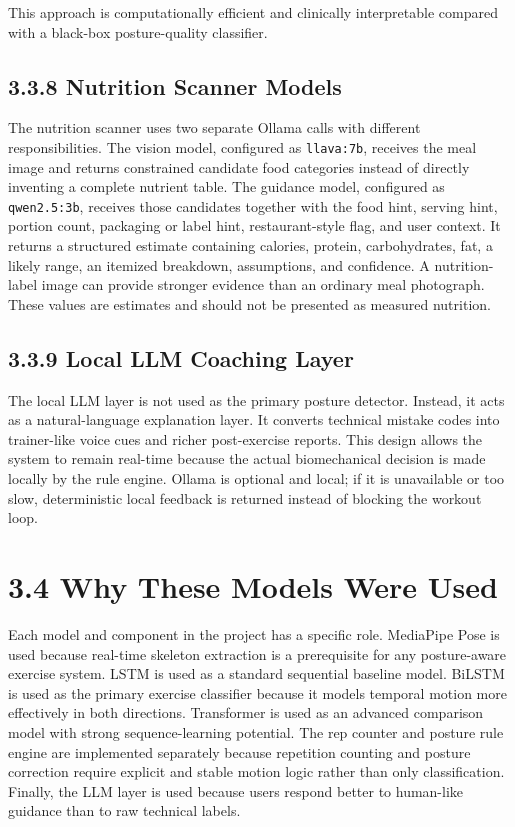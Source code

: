 \documentclass[12pt,a4paper]{report}
\begin{document}
This approach is computationally efficient and clinically interpretable compared with a black-box posture-quality classifier.

\subsection{3.3.8 Nutrition Scanner Models}
The nutrition scanner uses two separate Ollama calls with different responsibilities. The vision model, configured as \texttt{llava:7b}, receives the meal image and returns constrained candidate food categories instead of directly inventing a complete nutrient table. The guidance model, configured as \texttt{qwen2.5:3b}, receives those candidates together with the food hint, serving hint, portion count, packaging or label hint, restaurant-style flag, and user context. It returns a structured estimate containing calories, protein, carbohydrates, fat, a likely range, an itemized breakdown, assumptions, and confidence. A nutrition-label image can provide stronger evidence than an ordinary meal photograph. These values are estimates and should not be presented as measured nutrition.

\subsection{3.3.9 Local LLM Coaching Layer}
The local LLM layer is not used as the primary posture detector. Instead, it acts as a natural-language explanation layer. It converts technical mistake codes into trainer-like voice cues and richer post-exercise reports. This design allows the system to remain real-time because the actual biomechanical decision is made locally by the rule engine. Ollama is optional and local; if it is unavailable or too slow, deterministic local feedback is returned instead of blocking the workout loop.

\section{3.4 Why These Models Were Used}
Each model and component in the project has a specific role. MediaPipe Pose is used because real-time skeleton extraction is a prerequisite for any posture-aware exercise system. LSTM is used as a standard sequential baseline model. BiLSTM is used as the primary exercise classifier because it models temporal motion more effectively in both directions. Transformer is used as an advanced comparison model with strong sequence-learning potential. The rep counter and posture rule engine are implemented separately because repetition counting and posture correction require explicit and stable motion logic rather than only classification. Finally, the LLM layer is used because users respond better to human-like guidance than to raw technical labels.
\end{document}
